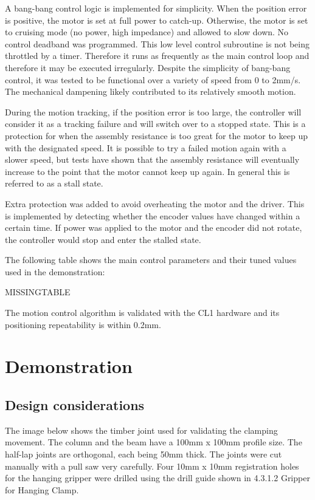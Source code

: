 A bang-bang control logic is implemented for simplicity. When the position error is positive, the motor is set at full power to catch-up. Otherwise, the motor is set to cruising mode (no power, high impedance) and allowed to slow down. No control deadband was programmed. This low level control subroutine is not being throttled by a timer. Therefore it runs as frequently as the main control loop and therefore it may be executed irregularly. Despite the simplicity of bang-bang control, it was tested to be functional over a variety of speed from 0 to 2mm/s. The mechanical dampening likely contributed to its relatively smooth motion.

During the motion tracking, if the position error is too large, the controller will consider it as a tracking failure and will switch over to a stopped state. This is a protection for when the assembly resistance is too great for the motor to keep up with the designated speed. It is possible to try a failed motion again with a slower speed, but tests have shown that the assembly resistance will eventually increase to the point that the motor cannot keep up again. In general this is referred to as a stall state. 

Extra protection was added to avoid overheating the motor and the driver. This is implemented by detecting whether the encoder values have changed within a certain time. If power was applied to the motor and the encoder did not rotate, the controller would stop and enter the stalled state. 

The following table shows the main control parameters and their tuned values used in the demonstration:

MISSINGTABLE

The motion control algorithm is validated with the CL1 hardware and its positioning repeatability is within 0.2mm.

\section{Demonstration}
\label{section:exploration_1_demonstration}

\subsection{Design considerations}
\label{subsection:exploration_1_design_considerations}

The image below shows the timber joint used for validating the clamping movement. The column and the beam have a 100mm x 100mm profile size. The half-lap joints are orthogonal, each being 50mm thick. The joints were cut manually with a pull saw very carefully. Four 10mm x 10mm registration holes for the hanging gripper were drilled using the drill guide shown in 4.3.1.2 Gripper for Hanging Clamp.

